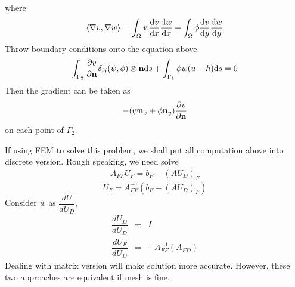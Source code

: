 \documentclass{note}
\begin{document}
where 
\begin{eqnarray*}
\langle \nabla v,\nabla w \rangle  = \int_{\Omega}\psi\frac{\mathrm{d} v}{\mathrm{d} x}\frac{\mathrm{d} w}{\mathrm{d} x} + \int_{\Omega}\phi\frac{\mathrm{d} v}{\mathrm{d} y}\frac{\mathrm{d} w}{\mathrm{d} y}
\end{eqnarray*}
Throw boundary conditions onto the equation above
\begin{eqnarray}
\int_{\Gamma_2} \frac{\partial v}{\partial \mathbf{n}} \delta_{ij} (\psi,\phi)\otimes\mathbf{n} \mathrm{d} s +  \int_{\Gamma_1} \phi w(u-h)\mathrm{d} s = 0
\end{eqnarray}
Then the gradient can be taken as
$$-(\psi \mathbf{n}_x + \phi \mathbf{n}_y )\frac{\partial v}{\partial \mathbf{n}}$$
on each point of $\Gamma_2$.
\begin{remark}
If using FEM to solve this problem, we shall put all computation above into discrete version. Rough speaking, we need solve 
\begin{eqnarray}
A_{FF} U_F = b_F - (A U_D)_F
\end{eqnarray}
\begin{equation}
U_F = A_{FF}^{-1}(b_F - (AU_D)_F)
\end{equation}
Consider $w$ as $\dfrac{dU}{dU_D}$,
\begin{eqnarray}
\dfrac{dU_D}{d U_D} &=& I\\
\dfrac{dU_F}{d U_D} &=& -A_{FF}^{-1}(A_{FD})
\end{eqnarray}
Dealing with matrix version will make solution more accurate. However, these two approaches are equivalent if mesh is fine.
\end{remark}
\end{document}
